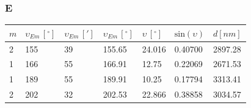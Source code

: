 \documentclass[a4paper, 11pt]{article}
\begin{document}
\subsubsection{E}\label{sec:e} %
\begin{center}
	\begin{tabular}{|l|l|l|l|l|l|l|}
		\hline
		$m $ & $\upsilon_{Em} \, [^{\circ}]$ & $\upsilon_{Em} \, [']$ & $\upsilon_{Em} \, [^{\circ}]$ & $\upsilon \, [^{\circ}]$ & $\text{sin}(\upsilon)$ & $d [nm]$ \\ \hline
		2    & 155                           & 39                     & 155.65                        & 24.016                   & 0.40700                & 2897.28  \\ \hline
		1    & 166                           & 55                     & 166.91                        & 12.75                    & 0.22069                & 2671.53  \\ \hline
		1    & 189                           & 55                     & 189.91                        & 10.25                    & 0.17794                & 3313.41  \\ \hline
		2    & 202                           & 32                     & 202.53                        & 22.866                   & 0.38858                & 3034.57  \\ \hline
	\end{tabular}
\end{center}
\end{document}
